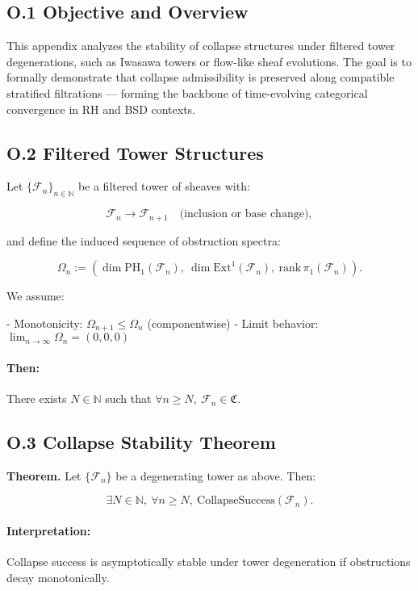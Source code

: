 \documentclass[11pt]{article}
\begin{document}
\subsection*{O.1 Objective and Overview}

This appendix analyzes the stability of collapse structures under filtered tower degenerations, such as Iwasawa towers or flow-like sheaf evolutions. The goal is to formally demonstrate that collapse admissibility is preserved along compatible stratified filtrations — forming the backbone of time-evolving categorical convergence in RH and BSD contexts.

\subsection*{O.2 Filtered Tower Structures}

Let \( \{ \mathcal{F}_n \}_{n \in \mathbb{N}} \) be a filtered tower of sheaves with:

\[
\mathcal{F}_n \to \mathcal{F}_{n+1} \quad \text{(inclusion or base change)},
\]

and define the induced sequence of obstruction spectra:

\[
\Omega_n := \left( \dim \mathrm{PH}_1(\mathcal{F}_n),\ \dim \mathrm{Ext}^1(\mathcal{F}_n),\ \mathrm{rank} \, \pi_1(\mathcal{F}_n) \right).
\]

We assume:

- Monotonicity: \( \Omega_{n+1} \leq \Omega_n \) (componentwise)
- Limit behavior: \( \lim_{n \to \infty} \Omega_n = (0,0,0) \)

\paragraph{Then:} There exists \( N \in \mathbb{N} \) such that \( \forall n \geq N,\ \mathcal{F}_n \in \mathfrak{C} \).

\subsection*{O.3 Collapse Stability Theorem}

\textbf{Theorem.}  
Let \( \{ \mathcal{F}_n \} \) be a degenerating tower as above. Then:

\[
\exists N \in \mathbb{N},\ \forall n \geq N,\ \text{CollapseSuccess}(\mathcal{F}_n).
\]

\paragraph{Interpretation:} Collapse success is asymptotically stable under tower degeneration if obstructions decay monotonically.
\end{document}
